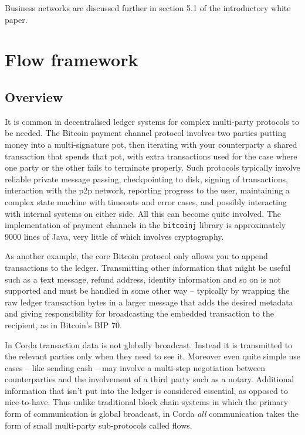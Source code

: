 \documentclass{article}
\begin{document}
Business networks are discussed further in section 5.1 of the introductory white paper.

\section{Flow framework}\label{sec:flows}

\subsection{Overview}

It is common in decentralised ledger systems for complex multi-party protocols to be needed. The Bitcoin payment
channel protocol\cite{PaymentChannels} involves two parties putting money into a multi-signature pot, then
iterating with your counterparty a shared transaction that spends that pot, with extra transactions used for the
case where one party or the other fails to terminate properly. Such protocols typically involve reliable private
message passing, checkpointing to disk, signing of transactions, interaction with the p2p network, reporting
progress to the user, maintaining a complex state machine with timeouts and error cases, and possibly interacting
with internal systems on either side. All this can become quite involved. The implementation of payment channels in
the \texttt{bitcoinj} library is approximately 9000 lines of Java, very little of which involves cryptography.

As another example, the core Bitcoin protocol only allows you to append transactions to the ledger. Transmitting
other information that might be useful such as a text message, refund address, identity information and so on is
not supported and must be handled in some other way -- typically by wrapping the raw ledger transaction bytes in a
larger message that adds the desired metadata and giving responsibility for broadcasting the embedded transaction
to the recipient, as in Bitcoin's BIP 70\cite{BIP70}.

In Corda transaction data is not globally broadcast. Instead it is transmitted to the relevant parties only when
they need to see it. Moreover even quite simple use cases -- like sending cash -- may involve a multi-step
negotiation between counterparties and the involvement of a third party such as a notary. Additional information
that isn't put into the ledger is considered essential, as opposed to nice-to-have. Thus unlike traditional block
chain systems in which the primary form of communication is global broadcast, in Corda \emph{all} communication
takes the form of small multi-party sub-protocols called flows.
\end{document}
